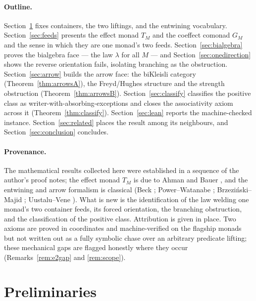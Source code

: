 \documentclass[11pt]{amsart}
\theoremstyle{plain}
\theoremstyle{definition}
\theoremstyle{remark}
\begin{document}
\paragraph{Outline.}
Section~\ref{sec:prelim} fixes containers, the two liftings, and the entwining vocabulary.
Section~\ref{sec:feeds} presents the effect monad $T_M$ and the coeffect comonad $G_M$ and
the sense in which they are one monad's two feeds. Section~\ref{sec:bialgebra} proves the
bialgebra face --- the law $\lambda$ for all $M$ --- and Section~\ref{sec:onedirection}
shows the reverse orientation fails, isolating branching as the obstruction.
Section~\ref{sec:arrow} builds the arrow face: the biKleisli category
(Theorem~\ref{thm:arrowsA}), the Freyd/Hughes structure and the strength obstruction
(Theorem~\ref{thm:arrowsB}). Section~\ref{sec:classify} classifies the positive class as
writer-with-absorbing-exceptions and closes the associativity axiom across it
(Theorem~\ref{thm:classify}). Section~\ref{sec:lean} reports the machine-checked instance.
Section~\ref{sec:related} places the result among its neighbours, and
Section~\ref{sec:conclusion} concludes.

\paragraph{Provenance.}
The mathematical results collected here were established in a sequence of the author's proof
notes; the effect monad $T_M$ is due to Ahman and Bauer \cite{AhmanBauer24}, and the
entwining and arrow formalism is classical (Beck \cite{Beck69}; Power--Watanabe
\cite{PowerWatanabe02}; Brzezi\'nski--Majid \cite{BrzezinskiMajid98}; Uustalu--Vene
\cite{UustaluVene08}). What is new is the identification of the law welding one monad's two
container feeds, its forced orientation, the branching obstruction, and the classification
of the positive class. Attribution is given in place. Two axioms are proved in coordinates
and machine-verified on the flagship monads but not written out as a fully symbolic chase over
an arbitrary predicate lifting; these mechanical gaps are flagged honestly where they occur
(Remarks~\ref{rem:e2gap} and \ref{rem:scope}).

\section{Preliminaries}\label{sec:prelim}
\end{document}
